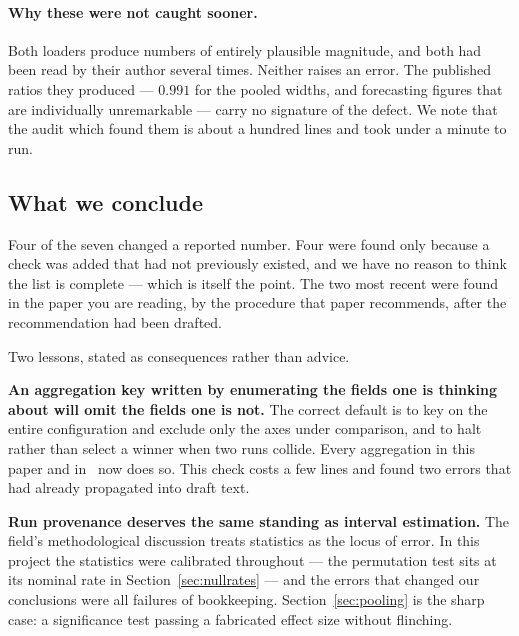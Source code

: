 \documentclass[11pt,onecolumn]{article}
\newif\ifdraft
\newcommand{\pendpara}[1]{%
  \ifdraft\par\vspace{2pt}\noindent
  \fcolorbox{PendFG}{PendBG}{\begin{minipage}{0.97\linewidth}\small
    \textcolor{PendFG}{\textbf{PENDING.} #1}\end{minipage}}\par\vspace{4pt}\fi}
\begin{document}
\paragraph{Why these were not caught sooner.}
Both loaders produce numbers of entirely plausible magnitude, and both
had been read by their author several times. Neither raises an error.
The published ratios they produced --- $0.991$ for the pooled widths,
and forecasting figures that are individually unremarkable --- carry no
signature of the defect. We note that the audit which found them is
about a hundred lines and took under a minute to run.

\subsection{What we conclude}
Four of the seven changed a reported number. Four were found only
because a check was added that had not previously existed, and we have
no reason to think the list is complete --- which is itself the point.
The two most recent were found in the paper you are reading, by the
procedure that paper recommends, after the recommendation had been
drafted.

Two lessons, stated as consequences rather than advice.

\textbf{An aggregation key written by enumerating the fields one is
thinking about will omit the fields one is not.} The correct default is
to key on the entire configuration and exclude only the axes under
comparison, and to halt rather than select a winner when two runs
collide. Every aggregation in this paper and in~\cite{paperb} now does
so. This check costs a few lines and found two errors that had already
propagated into draft text.

\textbf{Run provenance deserves the same standing as interval
estimation.} The field's methodological discussion treats statistics as
the locus of error. In this project the statistics were calibrated
throughout --- the permutation test sits at its nominal rate in
Section~\ref{sec:nullrates} --- and the errors that changed our
conclusions were all failures of bookkeeping. Section~\ref{sec:pooling}
is the sharp case: a significance test passing a fabricated effect size
without flinching.

\pendpara{We would like to report whether this class of error is common
in published work, but it is not detectable from a paper --- only from
its pipeline. We note that as a limitation of the present contribution
and as an argument for releasing aggregation code rather than only
results.}
\end{document}
